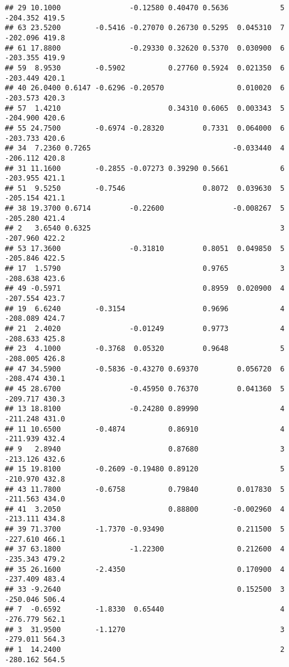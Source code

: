 \documentclass[]{article}
\begin{document}
\begin{verbatim}
## 29 10.1000                -0.12580 0.40470 0.5636            5 -204.352 419.5
## 63 23.5200        -0.5416 -0.27070 0.26730 0.5295  0.045310  7 -202.096 419.8
## 61 17.8800                -0.29330 0.32620 0.5370  0.030900  6 -203.355 419.9
## 59  8.9530        -0.5902          0.27760 0.5924  0.021350  6 -203.449 420.1
## 40 26.0400 0.6147 -0.6296 -0.20570                 0.010020  6 -203.573 420.3
## 57  1.4210                         0.34310 0.6065  0.003343  5 -204.900 420.6
## 55 24.7500        -0.6974 -0.28320         0.7331  0.064000  6 -203.733 420.6
## 34  7.2360 0.7265                                 -0.033440  4 -206.112 420.8
## 31 11.1600        -0.2855 -0.07273 0.39290 0.5661            6 -203.955 421.1
## 51  9.5250        -0.7546                  0.8072  0.039630  5 -205.154 421.1
## 38 19.3700 0.6714         -0.22600                -0.008267  5 -205.280 421.4
## 2   3.6540 0.6325                                            3 -207.960 422.2
## 53 17.3600                -0.31810         0.8051  0.049850  5 -205.846 422.5
## 17  1.5790                                 0.9765            3 -208.638 423.6
## 49 -0.5971                                 0.8959  0.020900  4 -207.554 423.7
## 19  6.6240        -0.3154                  0.9696            4 -208.089 424.7
## 21  2.4020                -0.01249         0.9773            4 -208.633 425.8
## 23  4.1000        -0.3768  0.05320         0.9648            5 -208.005 426.8
## 47 34.5900        -0.5836 -0.43270 0.69370         0.056720  6 -208.474 430.1
## 45 28.6700                -0.45950 0.76370         0.041360  5 -209.717 430.3
## 13 18.8100                -0.24280 0.89990                   4 -211.248 431.0
## 11 10.6500        -0.4874          0.86910                   4 -211.939 432.4
## 9   2.8940                         0.87680                   3 -213.126 432.6
## 15 19.8100        -0.2609 -0.19480 0.89120                   5 -210.970 432.8
## 43 11.7800        -0.6758          0.79840         0.017830  5 -211.563 434.0
## 41  3.2050                         0.88800        -0.002960  4 -213.111 434.8
## 39 71.3700        -1.7370 -0.93490                 0.211500  5 -227.610 466.1
## 37 63.1800                -1.22300                 0.212600  4 -235.343 479.2
## 35 26.1600        -2.4350                          0.170900  4 -237.409 483.4
## 33 -9.2640                                         0.152500  3 -250.046 506.4
## 7  -0.6592        -1.8330  0.65440                           4 -276.779 562.1
## 3  31.9500        -1.1270                                    3 -279.011 564.3
## 1  14.2400                                                   2 -280.162 564.5

\end{verbatim}
\end{document}
